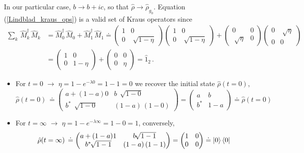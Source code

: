 \documentclass[11pt]{article}
\numberwithin{equation}{section} %
\numberwithin{figure}{section} %
\begin{document}
\begin{appendices}
\begin{equation}
\end{equation}
In our particular case, $b\rightarrow b+ic$, so that $\hat{\rho}\rightarrow\hat{\rho}_{g_0}$. Equation (\ref{Lindblad_kraus_ops}) is a valid set of Kraus operators since 
\begin{equation}
\begin{split}
\sum_k\,\hat{M}_k^\dagger\,\hat{M}_k
&=\hat{M}_0^\dagger\,\hat{M}_0 + \hat{M}_1^\dagger\,\hat{M}_1 \doteq \begin{pmatrix}1&0\\0&\sqrt[]{1-\eta}\end{pmatrix}\begin{pmatrix}1&0\\0&\sqrt[]{1-\eta}\end{pmatrix}+ \begin{pmatrix}0&0\\\sqrt[]{\eta}&0\end{pmatrix}\begin{pmatrix}0&\sqrt[]{\eta}\\0&0\end{pmatrix} \\
&= \begin{pmatrix}1&0\\0&{1-\eta}\end{pmatrix}+ \begin{pmatrix}0&0\\0&{\eta}\end{pmatrix}=\hat{1}_2\,\textrm{.}
\end{split}
\end{equation}
\begin{itemize}
\item For $t=0$ $\rightarrow$ $\eta=1-e^{-\lambda 0}=1-1=0$ we recover the initial state $\hat{\rho}(t=0)$,  \begin{equation}
\hat{\rho}(t=0)\,\doteq \begin{pmatrix}a+(1-a) 0&b\,\sqrt[]{1-0}\\b^*\,\sqrt[]{1-0}&(1-a)\,(1-0)\end{pmatrix} = \begin{pmatrix}a&b\\b^*&1-a\end{pmatrix} \doteq \hat{\rho}(t=0)
\end{equation} \label{Lindblad_evol_infinity}
\item For $t=\infty$ $\rightarrow$ $\eta=1-e^{-\lambda \infty}=1-0=1$, conversely, \begin{equation}
\hat{\rho}(t=\infty)\,\doteq \begin{pmatrix}a+(1-a) 1&b\,\sqrt[]{1-1}\\b^*\,\sqrt[]{1-1}&(1-a)\,(1-1)\end{pmatrix} = \begin{pmatrix}1&0\\0&0\end{pmatrix} \doteq \ket{0}\bra{0}

\end{equation}
\end{itemize}
\end{appendices}
\end{document}
